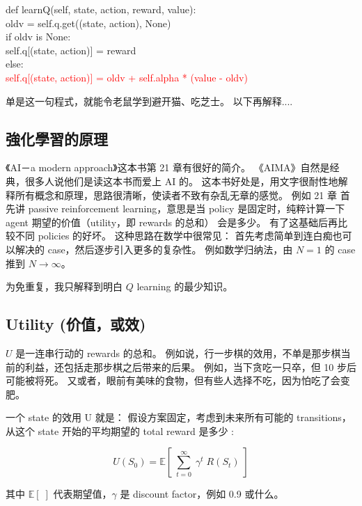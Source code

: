 \documentclass[orivec]{llncs}
\newcommand{\code}[1]{{\footnotesize{\ttfamily #1}}}
\newcommand{\tab}{\hspace*{1cm} }
\begin{document}
\tab \code{def learnQ(self, state, action, reward, value): }\\
\tab \code{oldv = self.q.get((state, action), None) }\\
\tab \code{if oldv is None:} \\
\tab \code{\tab self.q[(state, action)] = reward }\\
\tab \code{else: }\\
\tab \code{\tab \textcolor{red}{self.q[(state, action)] = oldv + self.alpha * (value - oldv) }}

单是这一句程式，就能令老鼠学到避开猫、吃芝士。  以下再解释....


\subsection{強化學習的原理}

《AI－a modern approach》这本书第 21 章有很好的简介。  《AIMA》自然是经典，很多人说他们是读这本书而爱上 AI 的。  这本书好处是，用文字很耐性地解释所有概念和原理，思路很清晰，使读者不致有杂乱无章的感觉。  例如 21 章 首先讲 passive reinforcement learning，意思是当 policy 是固定时，纯粹计算一下 agent 期望的价值（utility，即 rewards 的总和） 会是多少。  有了这基础后再比较不同 policies 的好坏。  这种思路在数学中很常见： 首先考虑简单到连白痴也可以解决的 case，然后逐步引入更多的复杂性。  例如数学归纳法，由 $N=1$ 的 case 推到 $N \rightarrow \infty$。

为免重复，我只解释到明白 $Q$ learning 的最少知识。

\subsection{Utility (价值，或效)}

$U$ 是一连串行动的 rewards 的总和。  例如说，行一步棋的效用，不单是那步棋当前的利益，还包括走那步棋之后带来的后果。  例如，当下贪吃一只卒，但 10 步后可能被将死。  又或者，眼前有美味的食物，但有些人选择不吃，因为怕吃了会变肥。

一个 state 的效用 U 就是： 假设方案固定，考虑到未来所有可能的 transitions，从这个 state 开始的平均期望的 total reward 是多少 :

$$ U(S_0) = \mathbb{E}[ \; \sum_{t=0}^{\infty} \; \gamma^t \; R(S_t) \; ] $$

其中 $\mathbb{E[\;]}$ 代表期望值，$\gamma$ 是 discount factor，例如 0.9 或什么。
\end{document}
